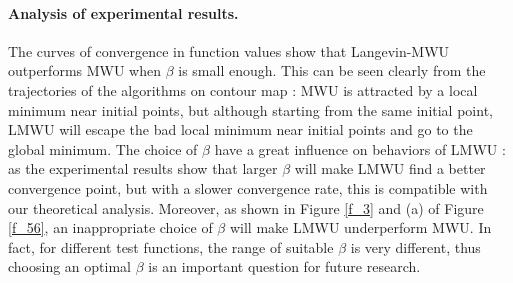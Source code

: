 \paragraph{Analysis of experimental results.} The curves of convergence in function values show that Langevin-MWU outperforms MWU when $\beta$ is small enough. This can be seen clearly from the trajectories of the algorithms on contour map : MWU is  attracted by a local minimum near initial points, but although starting from the same initial point, LMWU will escape the bad local minimum near initial points and go to the global minimum. The choice of $\beta$ have a great influence on behaviors of LMWU : as the experimental results show that larger $\beta$ will make LMWU find a better convergence point, but with a slower convergence rate, this is compatible with our theoretical analysis. Moreover, as shown in Figure \eqref{f_3} and (a) of Figure \eqref{f_56}, an inappropriate choice of $\beta$ will make LMWU underperform MWU. In fact, for different test functions, the range of suitable $\beta$ is very different, thus choosing an optimal $\beta$ is an important question for future research.


